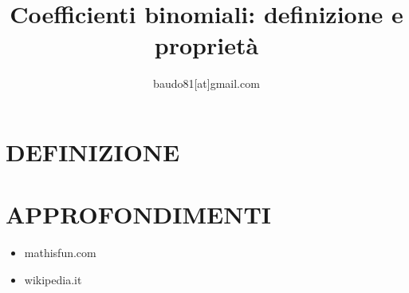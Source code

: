 \documentclass[a4paper,10pt]{article}
\title{Coefficienti binomiali: definizione e proprietà}
\author{baudo81[at]gmail.com}
\begin{document}
\maketitle

\section{DEFINIZIONE}

\section{APPROFONDIMENTI}
\begin{itemize}
 \item mathisfun.com \cite{tbin}
 \item wikipedia.it \cite{coefbin}
\end{itemize}




 

\end{document}
